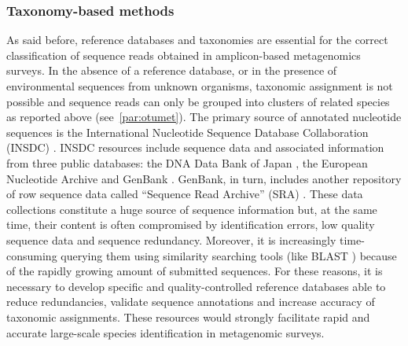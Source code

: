 \subsubsection*{Taxonomy-based methods}
As said before, reference databases and taxonomies are essential for the correct classification of sequence reads obtained in amplicon-based metagenomics surveys. In the absence of a reference database, or in the presence of environmental sequences from unknown organisms, taxonomic assignment is not possible and sequence reads can only be grouped into clusters of related species as reported above (see~\ref{par:otumet}). The primary source of annotated nucleotide sequences is the International Nucleotide Sequence Database Collaboration (INSDC) \cite{nakamura2013international}. INSDC resources include sequence data and associated information from three public databases: the DNA Data Bank of Japan \cite{sugawara2007ddbj}, the European Nucleotide Archive \cite{leinonen2010european} and GenBank \cite{benson2012genbank}. GenBank, in turn, includes another repository of row sequence data called ``Sequence Read Archive'' (SRA) \cite{kodama2012sequence}. These data collections constitute a huge source of sequence information but, at the same time, their content is often compromised by identification errors, low quality sequence data and sequence redundancy. Moreover, it is increasingly time-consuming querying them using similarity searching tools (like BLAST \cite{altschul1990basic}) because of the rapidly growing amount of submitted sequences. For these reasons, it is necessary to develop specific and quality-controlled reference databases able to reduce redundancies, validate sequence annotations and increase accuracy of taxonomic assignments. These resources would strongly facilitate rapid and accurate large-scale species identification in metagenomic surveys.\\

